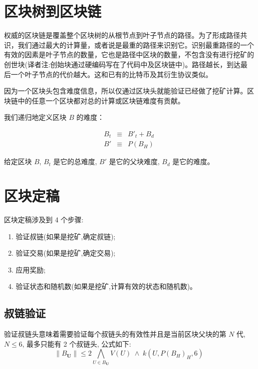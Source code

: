 \documentclass[9pt,oneside]{amsart}
\begin{document}
\begin{multicols}{2}
\section{区块树到区块链} \label{ch:ghost}

权威的区块链是覆盖整个区块树的从根节点到叶子节点的路径。为了形成路径共识，我们通过最大的计算量，或者说是最重的路径来识别它。识别最重路径的一个有效的因素是叶子节点的数量，它也是路径中区块的数量，不包含没有进行挖矿的创世块(译者注:创始块通过硬编码写在了代码中及区块链中)。路径越长，到达最后一个叶子节点的代价越大。这和已有的比特币及其衍生协议类似。

因为一个区块头包含难度信息，所以仅通过区块头就能验证已经做了挖矿计算。区块链中的任意一个区块都对总的计算或区块链难度有贡献。

我们递归地定义区块 $B$ 的难度：

\begin{eqnarray}
B_t & \equiv & B'_t + B_d \\
B' & \equiv & P(B_H)
\end{eqnarray}

给定区块 $B$, $B_t$ 是它的总难度, $B'$ 是它的父块难度, $B_d$ 是它的难度。

\section{区块定稿} \label{ch:finalisation}

区块定稿涉及到 4 个步骤:

\begin{enumerate}
\item 验证叔链(如果是挖矿,确定叔链);
\item 验证交易(如果是挖矿,确定交易);
\item 应用奖励;
\item 验证状态和随机数(如果是挖矿,计算有效的状态和随机数)。
\end{enumerate}

\subsection{叔链验证}

验证叔链头意味着需要验证每个叔链头的有效性并且是当前区块父块的第 $N$ 代, $N \leq 6$, 最多只能有 2 个叔链头, 公式如下:
\begin{equation}
\lVert B_\mathbf{U} \rVert \leqslant 2 \bigwedge_{U \in B_\mathbf{U}} V(U) \; \wedge \; k(U, P(B_H)_H, 6)
\end{equation}


\end{multicols}
\end{document}
